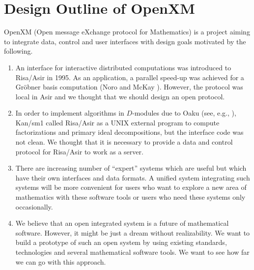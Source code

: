 
\section{Design Outline of OpenXM}

OpenXM (Open message eXchange protocol for Mathematics)
is a project aiming to integrate data, control and user interfaces
with design goals motivated by the following.

\begin{enumerate}
\item 
An interface for interactive distributed computations was introduced
to Risa/Asir \cite{asir} in 1995.
As an application,
a parallel speed-up was achieved for a Gr\"obner basis computation
(Noro and McKay \cite{noro-mckay}).
However, the protocol was local in Asir and we thought that we should
design an open protocol.
\item 
In order to implement algorithms in $D$-modules due to Oaku 
(see, e.g., \cite{sst-book}),
Kan/sm1 \cite{kan} called Risa/Asir as a UNIX external program to 
compute factorizations and primary ideal decompositions,
but the interface code was not clean.
We thought that it is necessary to provide a data and control protocol
for Risa/Asir to work as a server.

\item 
There are increasing number of ``expert'' systems which are useful
but which have their own interfaces and data formats.
A unified system integrating such systems
will be more convenient
for users who want to explore a new area of mathematics with these
software tools or users who need these systems only occasionally.

\item  We believe that an open integrated system is a future of mathematical
software.
However, it might be just a dream without realizability.
We want to build a prototype of such an open system by using
existing standards, technologies and several mathematical software tools.
We want to see how far we can go with this approach.
\end{enumerate}

